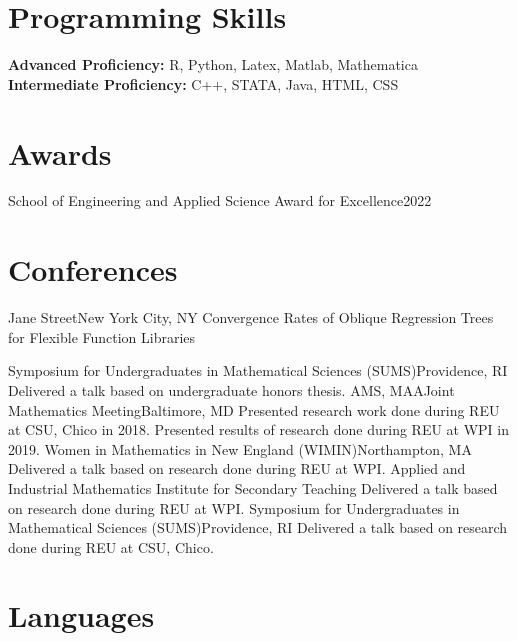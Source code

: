 \documentclass[10pt,a4paper,roman]{moderncv}        %
\begin{document}
\section{Programming Skills}
\textbf{Advanced Proficiency: } R, Python, Latex, Matlab, Mathematica\\
\textbf{Intermediate Proficiency: } C++, STATA, Java, HTML, CSS


\section{Awards}
{School of Engineering and Applied Science Award for Excellence}{2022}
{}{}

\section{Conferences}

{Jane Street}{New York City, NY}
{}{Convergence Rates of Oblique Regression Trees for Flexible Function Libraries}

{Symposium for Undergraduates in Mathematical Sciences (SUMS)}{Providence, RI}
{}{Delivered a talk based on undergraduate honors thesis.}
{AMS, MAA}{Joint Mathematics Meeting}{Baltimore, MD}
{}{Presented research work done during REU at CSU, Chico in 2018.
  Presented results of research done during REU at WPI in 2019.}
{Women in Mathematics in New England (WIMIN)}{Northampton, MA}
{}{Delivered a talk based on research done during REU at WPI.}
{Applied and Industrial Mathematics Institute for Secondary Teaching}
{Delivered a talk based on research done during REU at WPI.}
{Symposium for Undergraduates in Mathematical Sciences (SUMS)}{Providence, RI}
{}{Delivered a talk based on research done during REU at CSU, Chico.}

\section{Languages}
\begin{cvcolumns}
\end{cvcolumns}

\clearpage
\end{document}
